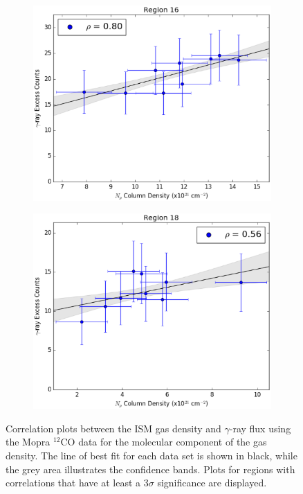 \documentclass[12pt,a4paper]{article}
\begin{document}
\begin{figure}[H]
\begin{subfigure}{0.5\textwidth}
		\includegraphics[width=0.9\linewidth, height=0.25\textheight]{gamma_mHI_reg16}
	\end{subfigure}
	\begin{subfigure}{0.5\textwidth}
	\centering
	\includegraphics[width=0.95\linewidth, height=0.25\textheight]{gamma_mHI_reg18}
	\end{subfigure}
	\caption{Correlation plots between the ISM gas density and $\gamma$-ray flux using the Mopra $^{12}$CO data for the molecular component of the gas density. The line of best fit for each data set is shown in black, while the grey area illustrates the confidence bands. Plots for regions with correlations that have at least a 3$\sigma$ significance are displayed.}
	\label{fig:regionalgasgammacormop}
\end{figure}
\end{document}
